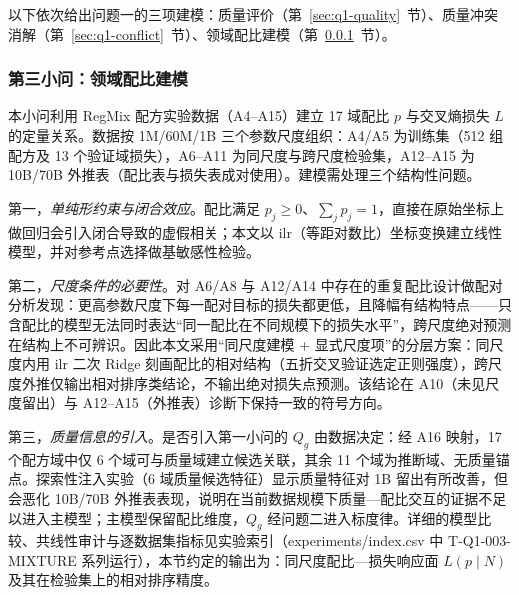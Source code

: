 以下依次给出问题一的三项建模：质量评价（第~\ref{sec:q1-quality}~节）、质量冲突消解（第~\ref{sec:q1-conflict}~节）、领域配比建模（第~\ref{sec:q1-mixture}~节）。




\subsubsection{第三小问：领域配比建模}
\label{sec:q1-mixture}

本小问利用 RegMix 配方实验数据（A4--A15）建立 17 域配比 $p$ 与交叉熵损失 $L$ 的定量关系。数据按 1M/60M/1B 三个参数尺度组织：A4/A5 为训练集（512 组配方及 13 个验证域损失），A6--A11 为同尺度与跨尺度检验集，A12--A15 为 10B/70B 外推表（配比表与损失表成对使用）。建模需处理三个结构性问题。

第一，\emph{单纯形约束与闭合效应}。配比满足 $p_j\ge0$、$\sum_jp_j=1$，直接在原始坐标上做回归会引入闭合导致的虚假相关；本文以 ilr（等距对数比）坐标变换建立线性模型，并对参考点选择做基敏感性检验。

第二，\emph{尺度条件的必要性}。对 A6/A8 与 A12/A14 中存在的重复配比设计做配对分析发现：更高参数尺度下每一配对目标的损失都更低，且降幅有结构特点——只含配比的模型无法同时表达“同一配比在不同规模下的损失水平”，跨尺度绝对预测在结构上不可辨识。因此本文采用“同尺度建模 + 显式尺度项”的分层方案：同尺度内用 ilr 二次 Ridge 刻画配比的相对结构（五折交叉验证选定正则强度），跨尺度外推仅输出相对排序类结论，不输出绝对损失点预测。该结论在 A10（未见尺度留出）与 A12--A15（外推表）诊断下保持一致的符号方向。

第三，\emph{质量信息的引入}。是否引入第一小问的 $Q_g$ 由数据决定：经 A16 映射，17 个配方域中仅 6 个域可与质量域建立候选关联，其余 11 个域为推断域、无质量锚点。探索性注入实验（6 域质量候选特征）显示质量特征对 1B 留出有所改善，但会恶化 10B/70B 外推表表现，说明在当前数据规模下质量—配比交互的证据不足以进入主模型；主模型保留配比维度，$Q_g$ 经问题二进入标度律。详细的模型比较、共线性审计与逐数据集指标见实验索引（experiments/index.csv 中 T-Q1-003-MIXTURE 系列运行），本节约定的输出为：同尺度配比—损失响应面 $L(p\mid N)$ 及其在检验集上的相对排序精度。
